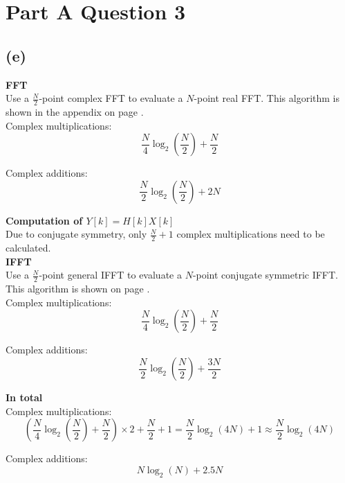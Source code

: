 \documentclass{article}
\newenvironment{homeworkProblem}[1]{
	\section*{#1}
	}{
}
\newenvironment{homeworkSection}[1]{
	\subsection*{#1}
	}{
}
\begin{document}
\begin{homeworkProblem}{Part A Question 3}
\begin{homeworkSection}{(e)}

\textbf{FFT}\\
Use a $\frac{N}{2}$-point complex FFT to evaluate a $N$-point real FFT. This algorithm is shown in the appendix on page \pageref{fft_real}.\\

Complex multiplications:
\begin{equation}
\frac{N}{4} \log_2(\frac{N}{2}) + \frac{N}{2}
\end{equation}

Complex additions:
\begin{equation}
\frac{N}{2} \log_2(\frac{N}{2}) + 2N
\end{equation}


\textbf{Computation of $Y[k] = H[k]X[k]$}\\
Due to conjugate symmetry, only $\frac{N}{2}+1$ complex multiplications need to be calculated.\\


\textbf{IFFT}\\
Use a $\frac{N}{2}$-point general IFFT to evaluate a $N$-point conjugate symmetric IFFT. This algorithm is shown on page \pageref{ifftcs}.\\

Complex multiplications:
\begin{equation}
\frac{N}{4} \log_2(\frac{N}{2}) + \frac{N}{2}
\end{equation}

Complex additions:
\begin{equation}
\frac{N}{2} \log_2(\frac{N}{2}) + \frac{3N}{2}
\end{equation}


\textbf{In total}\\

Complex multiplications:
\begin{equation}
\left( \frac{N}{4} \log_2(\frac{N}{2}) + \frac{N}{2} \right) \times 2 + \frac{N}{2}+1 = \frac{N}{2} \log_2(4N) + 1 \approx \frac{N}{2} \log_2(4N)
\end{equation}

Complex additions:
\begin{equation}
N \log_2(N) + 2.5N
\end{equation}



\end{homeworkSection}
\end{homeworkProblem}
\end{document}
